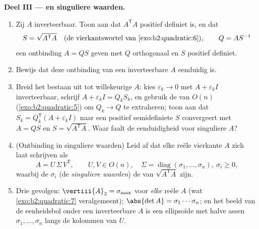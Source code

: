 \begin{problem}
\medskip
\noindent\textbf{Deel III ---  en singuliere
waarden.}
\begin{enumerate}[resume]
  \item Zij $A$ inverteerbaar. Toon aan dat $A^{\mathsf T}A$
        positief definiet is, en dat
        \[
        S = \sqrt{A^{\mathsf T}A}
        \quad\text{(de vierkantswortel van
        \cref{exo:b2:quadratic:6})},
        \qquad Q = AS^{-1}
        \]
        een ontbinding $A = QS$ geven met $Q$ orthogonaal en $S$
        positief definiet.
  \item Bewijs dat deze ontbinding van een inverteerbare $A$
        eenduidig is.
  \item Breid het bestaan uit tot willekeurige $A$: kies
        $\varepsilon_k \to 0$ met $A + \varepsilon_k I$
        inverteerbaar, schrijf $A + \varepsilon_kI = Q_kS_k$, en
        gebruik de  van $O(n)$
        (\cref{exo:b2:quadratic:5}) om $Q_k \to Q$ te extraheren;
        toon aan dat $S_k = Q_k^{\mathsf T}(A + \varepsilon_kI)$
        naar een positief semidefiniete $S$ convergeert met $A =
        QS$ en $S = \sqrt{A^{\mathsf T}A}$. Waar faalt de
        eenduidigheid voor singuliere $A$?
  \item (Ontbinding in singuliere waarden) Leid af dat elke reële
        vierkante $A$ zich laat schrijven als
        \[
        A = U\,\Sigma\,V^{\mathsf T},
        \qquad U, V \in O(n),\quad
        \Sigma = \operatorname{diag}(\sigma_1, \dots,
        \sigma_n),\ \sigma_i \geq 0 ,
        \]
        waarbij de $\sigma_i$ (de \emph{singuliere waarden}) de
         van $\sqrt{A^{\mathsf T}A}$ zijn.
  \item Drie gevolgen: $\vertiii{A}_2 = \sigma_{\max}$ voor
        \emph{elke} reële $A$ (wat \cref{exo:b2:quadratic:7}
        veralgemeent); $\abs{\det A} = \sigma_1\cdots\sigma_n$; en
        het beeld van de eenheidsbol onder een inverteerbare $A$ is
        een ellipsoïde met halve assen $\sigma_1, \dots, \sigma_n$
        langs de kolommen van $U$.
\end{enumerate}


\end{problem}

